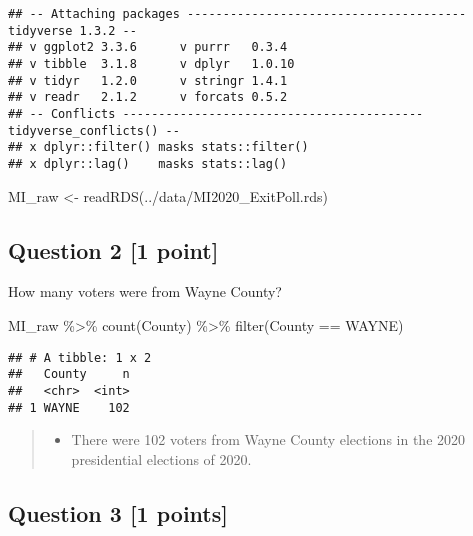\documentclass[
]{article}
\newenvironment{Shaded}{\begin{snugshade}}{\end{snugshade}}
\newcommand{\FunctionTok}[1]{\textcolor[rgb]{0.00,0.00,0.00}{#1}}
\newcommand{\NormalTok}[1]{#1}
\newcommand{\OtherTok}[1]{\textcolor[rgb]{0.56,0.35,0.01}{#1}}
\newcommand{\SpecialCharTok}[1]{\textcolor[rgb]{0.00,0.00,0.00}{#1}}
\newcommand{\StringTok}[1]{\textcolor[rgb]{0.31,0.60,0.02}{#1}}
\providecommand{\tightlist}{%
  \setlength{\itemsep}{0pt}\setlength{\parskip}{0pt}}
\begin{document}
\begin{verbatim}
## -- Attaching packages --------------------------------------- tidyverse 1.3.2 --
## v ggplot2 3.3.6      v purrr   0.3.4 
## v tibble  3.1.8      v dplyr   1.0.10
## v tidyr   1.2.0      v stringr 1.4.1 
## v readr   2.1.2      v forcats 0.5.2 
## -- Conflicts ------------------------------------------ tidyverse_conflicts() --
## x dplyr::filter() masks stats::filter()
## x dplyr::lag()    masks stats::lag()
\end{verbatim}

\begin{Shaded}
\begin{Highlighting}[]
\NormalTok{MI\_raw }\OtherTok{\textless{}{-}} \FunctionTok{readRDS}\NormalTok{(}\StringTok{\textquotesingle{}../data/MI2020\_ExitPoll.rds\textquotesingle{}}\NormalTok{)}
\end{Highlighting}
\end{Shaded}

\hypertarget{question-2-1-point}{%
\subsection{Question 2 {[}1 point{]}}\label{question-2-1-point}}

How many voters were from Wayne County?

\begin{Shaded}
\begin{Highlighting}[]
\NormalTok{MI\_raw }\SpecialCharTok{\%\textgreater{}\%}
  \FunctionTok{count}\NormalTok{(County) }\SpecialCharTok{\%\textgreater{}\%}
  \FunctionTok{filter}\NormalTok{(County }\SpecialCharTok{==} \StringTok{\textquotesingle{}WAYNE\textquotesingle{}}\NormalTok{)}
\end{Highlighting}
\end{Shaded}

\begin{verbatim}
## # A tibble: 1 x 2
##   County     n
##   <chr>  <int>
## 1 WAYNE    102
\end{verbatim}

\begin{quote}
\begin{itemize}
\tightlist
\item
  There were 102 voters from Wayne County elections in the 2020
  presidential elections of 2020.
\end{itemize}
\end{quote}

\hypertarget{question-3-1-points}{%
\subsection{Question 3 {[}1 points{]}}\label{question-3-1-points}}
\end{document}
